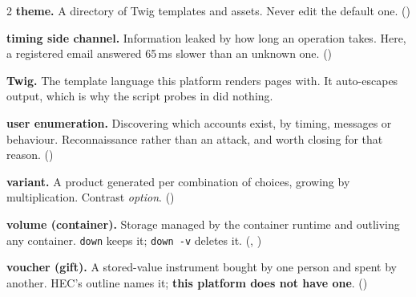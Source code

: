 \begin{multicols}{2}
\textbf{theme.} A directory of Twig templates and assets. Never edit the
default one. ()

\textbf{timing side channel.} Information leaked by how long an operation
takes. Here, a registered email answered 65\,ms slower than an unknown one.
()

\textbf{Twig.} The template language this platform renders pages with. It
auto-escapes output, which is why the script probes in  did
nothing.

\textbf{user enumeration.} Discovering which accounts exist, by timing,
messages or behaviour. Reconnaissance rather than an attack, and worth closing
for that reason. ()

\textbf{variant.} A product generated per combination of choices, growing by
multiplication. Contrast \emph{option}. ()

\textbf{volume (container).} Storage managed by the container runtime and
outliving any container. \texttt{down} keeps it; \texttt{down -v} deletes it.
(, )

\textbf{voucher (gift).} A stored-value instrument bought by one person and
spent by another. HEC's outline names it; \textbf{this platform does not have
one}. ()

\end{multicols}
